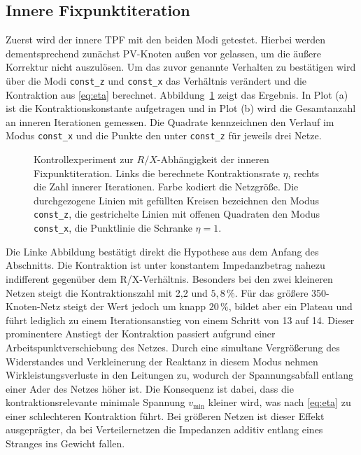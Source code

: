 \subsection{Innere Fixpunktiteration}
\label{subsec:rx_inner}

Zuerst wird der innere TPF mit den beiden Modi getestet.
Hierbei werden dementsprechend zunächst PV-Knoten außen vor gelassen, um die äußere Korrektur nicht auszulösen.
Um das zuvor genannte Verhalten zu bestätigen wird über die Modi \texttt{const\_z} und \texttt{const\_x} das Verhältnis verändert und die Kontraktion aus \eqref{eq:eta} berechnet.
Abbildung~\ref{fig:rx-inner} zeigt das Ergebnis.
In Plot (a) ist die Kontraktionskonstante aufgetragen und in Plot (b) wird die Gesamtanzahl an inneren Iterationen gemessen.
Die Quadrate kennzeichnen den Verlauf im Modus \texttt{const\_x} und die Punkte den unter \texttt{const\_z} für jeweils drei Netze.\\

\begin{figure}[htbp]
	\centering
	
	\caption{Kontrollexperiment zur $R/X$-Abhängigkeit der inneren
		Fixpunktiteration. Links die
		berechnete Kontraktionsrate $\eta$, rechts die Zahl innerer
		Iterationen. Farbe kodiert die Netzgröße. Die durchgezogene Linien mit gefüllten
		Kreisen bezeichnen den Modus \texttt{const\_z}, die gestrichelte Linien mit offenen Quadraten den Modus
		\texttt{const\_x}, die Punktlinie die Schranke
		$\eta=1$.}
	\label{fig:rx-inner}
\end{figure}

Die Linke Abbildung bestätigt direkt die Hypothese aus dem Anfang des Abschnitts. 
Die Kontraktion ist unter konstantem Impedanzbetrag nahezu indifferent gegenüber dem R/X-Verhältnis.
Besonders bei den zwei kleineren Netzen steigt die Kontraktionszahl mit 2,2 und $5,8\,\%$.
Für das größere 350-Knoten-Netz steigt der Wert jedoch um knapp $20\,\%$, bildet aber ein Plateau und führt lediglich zu einem Iterationsanstieg von einem Schritt von 13 auf 14.
Dieser prominentere Anstiegt der Kontraktion passiert aufgrund einer Arbeitspunktverschiebung des Netzes.
Durch eine simultane Vergrößerung des Widerstandes und Verkleinerung der Reaktanz in diesem Modus nehmen Wirkleistungsverluste in den Leitungen zu, wodurch der Spannungsabfall entlang einer Ader des Netzes höher ist.
Die Konsequenz ist dabei, dass die kontraktionsrelevante minimale Spannung $v_\mathrm{min}$ kleiner wird, was nach \eqref{eq:eta} zu einer schlechteren Kontraktion führt.
Bei größeren Netzen ist dieser Effekt ausgeprägter, da bei Verteilernetzen die Impedanzen additiv entlang eines Stranges ins Gewicht fallen.\\ 

